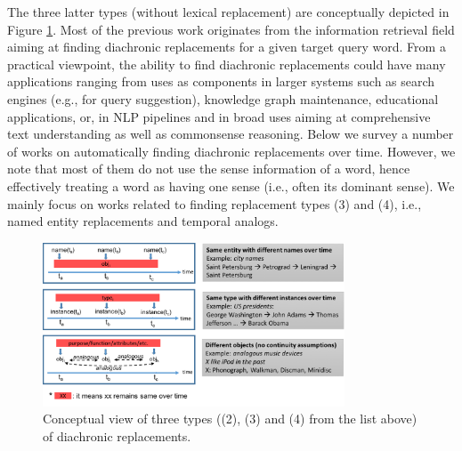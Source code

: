 \documentclass[output=paper]{langsci/langscibook}
\begin{document}
The three latter types (without lexical replacement) are conceptually depicted in Figure \ref{fig:across-time-sim}. Most of the previous work originates from the information retrieval field aiming at finding diachronic replacements for a given target query word. From a practical viewpoint, the ability to find diachronic replacements could have many applications ranging from uses as components in larger systems such as search engines (e.g., for query suggestion), knowledge graph maintenance, educational applications, or, in NLP pipelines and in broad uses aiming at comprehensive text understanding as well as commonsense reasoning. 
Below we survey a number of works on automatically finding diachronic replacements over time. However, we note that most of them do not use the sense information of a word, hence effectively treating a word as having one sense (i.e., often its dominant sense). 
We mainly focus on works related to finding replacement types (3) and (4), i.e., named entity replacements and temporal analogs.


\begin{figure}
	\includegraphics[width=0.8\textwidth]{figures/TAHMASEBI_Similarity_across_time3.png}
        \caption[Types of temporal analogs]{Conceptual view of three types ((2), (3) and (4) from the list above) of diachronic replacements.}
	\label{fig:across-time-sim}
\end{figure}
\end{document}
